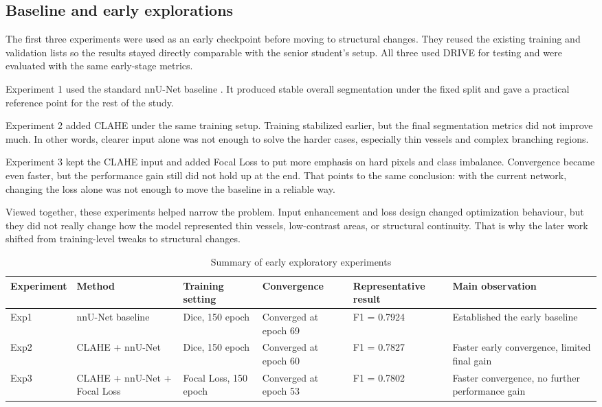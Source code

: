 \documentclass[a4paper,12pt]{article}
\begin{document}
\subsection{Baseline and early explorations}

The first three experiments were used as an early checkpoint before moving to structural changes. They reused the existing training and validation lists so the results stayed directly comparable with the senior student's setup. All three used DRIVE for testing and were evaluated with the same early-stage metrics.

Experiment 1 used the standard nnU-Net baseline \cite{isensee2021nnunet}. It produced stable overall segmentation under the fixed split and gave a practical reference point for the rest of the study.

Experiment 2 added CLAHE under the same training setup. Training stabilized earlier, but the final segmentation metrics did not improve much. In other words, clearer input alone was not enough to solve the harder cases, especially thin vessels and complex branching regions.

Experiment 3 kept the CLAHE input and added Focal Loss to put more emphasis on hard pixels and class imbalance. Convergence became even faster, but the performance gain still did not hold up at the end. That points to the same conclusion: with the current network, changing the loss alone was not enough to move the baseline in a reliable way.

Viewed together, these experiments helped narrow the problem. Input enhancement and loss design changed optimization behaviour, but they did not really change how the model represented thin vessels, low-contrast areas, or structural continuity. That is why the later work shifted from training-level tweaks to structural changes.

\begin{table}[htbp]
\centering
\caption{Summary of early exploratory experiments}
\label{tab:early_experiments_en}
\begin{tabular}{llllll}
\hline
Experiment & Method & Training setting & Convergence & Representative result & Main observation \\
\hline
Exp1 & nnU-Net baseline & Dice, 150 epoch & Converged at epoch 69 & F1 = 0.7924 & Established the early baseline \\
Exp2 & CLAHE + nnU-Net & Dice, 150 epoch & Converged at epoch 60 & F1 = 0.7827 & Faster early convergence, limited final gain \\
Exp3 & CLAHE + nnU-Net + Focal Loss & Focal Loss, 150 epoch & Converged at epoch 53 & F1 = 0.7802 & Faster convergence, no further performance gain \\
\hline
\end{tabular}
\end{table}
\end{document}
